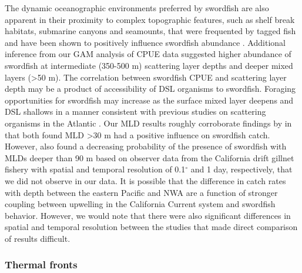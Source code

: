 The dynamic oceanographic environments preferred by swordfish are also apparent in their proximity to complex topographic features, such as shelf break habitats, submarine canyons and seamounts, that were frequented by tagged fish \citep{Podesta1993, Neilson2009, Palko1981} and have been shown to positively influence swordfish abundance \citep{Hazin2008, Bigelow1999, Scales2017}. Additional inference from our GAM analysis of CPUE data suggested higher abundance of swordfish at intermediate (350-500 m) scattering layer depths and deeper mixed layers (>50 m). The correlation between swordfish CPUE and scattering layer depth may be a product of accessibility of DSL organisms to swordfish. Foraging opportunities for swordfish may increase as the surface mixed layer deepens and DSL shallows in a manner consistent with previous studies on scattering organisms in the Atlantic \citep{Marchal1993}. Our MLD results roughly corroborate findings by \citet{Scales2017} in that both found MLD >30 m had a positive influence on swordfish catch. However, \citet{Scales2017} also found a decreasing probability of the presence of swordfish with MLDs deeper than 90 m based on observer data from the California drift gillnet fishery with spatial and temporal resolution of 0.1$^{\circ}$ and 1 day, respectively, that we did not observe in our data. It is possible that the difference in catch rates with depth between the eastern Pacific and NWA are a function of stronger coupling between upwelling in the California Current system and swordfish behavior. However, we would note that there were also significant differences in spatial and temporal resolution between the studies that made direct comparison of results difficult.

\subsubsection{Thermal fronts}

